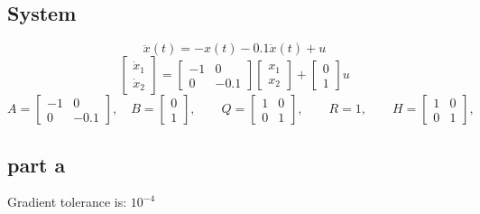 \subsection{System}
$$
\ddot{x}(t) = -x(t) - 0.1\dot{x}(t) + u
$$
$$
\begin{bmatrix}
	\dot{x}_1\\
	\dot{x}_2
\end{bmatrix} = \begin{bmatrix}
	-1 & 0\\
	0 & -0.1
\end{bmatrix}\begin{bmatrix}
	{x}_1\\
	{x}_2
\end{bmatrix} +\begin{bmatrix}
	0\\1
\end{bmatrix}u
$$
$$
A = \begin{bmatrix}
	-1 & 0\\
	0 & -0.1
\end{bmatrix}, \quad B = \begin{bmatrix}
	0\\1
\end{bmatrix}, \qquad Q = \begin{bmatrix}
	1 & 0\\
	0 & 1
\end{bmatrix}, \qquad R = 1, \qquad H = \begin{bmatrix}
	1 & 0\\
	0 & 1
\end{bmatrix},
$$
\subsection{part a}
Gradient tolerance is: $10^{-4}$

